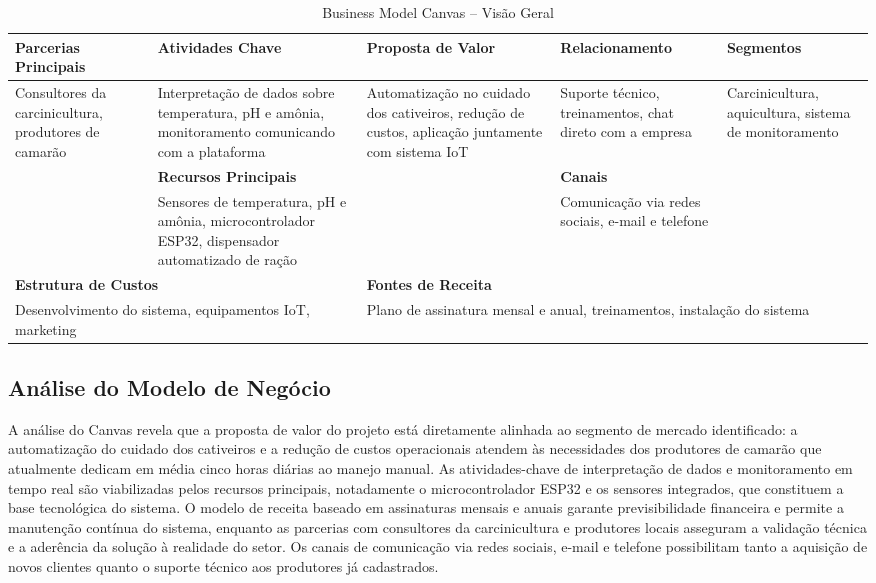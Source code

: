 \documentclass[11pt,a4paper]{article}
\begin{document}
\begin{table}[H]
\centering
\caption{Business Model Canvas -- Visão Geral}
\label{tab:canvas}
\small
\begin{tabular}{|p{2.5cm}|p{2.5cm}|p{2.8cm}|p{2.5cm}|p{2.8cm}|}
\hline
\textbf{Parcerias Principais} & \textbf{Atividades Chave} & \textbf{Proposta de Valor} & \textbf{Relacionamento} & \textbf{Segmentos} \\
\hline
Consultores da carcinicultura, produtores de camarão & Interpretação de dados sobre temperatura, pH e amônia, monitoramento comunicando com a plataforma & Automatização no cuidado dos cativeiros, redução de custos, aplicação juntamente com sistema IoT & Suporte técnico, treinamentos, chat direto com a empresa & Carcinicultura, aquicultura, sistema de monitoramento \\
\hline
 & \textbf{Recursos Principais} & & \textbf{Canais} & \\
\hline
 & Sensores de temperatura, pH e amônia, microcontrolador ESP32, dispensador automatizado de ração & & Comunicação via redes sociais, e-mail e telefone & \\
\hline
\multicolumn{2}{|p{5.5cm}|}{\textbf{Estrutura de Custos}} & \multicolumn{3}{p{7.5cm}|}{\textbf{Fontes de Receita}} \\
\hline
\multicolumn{2}{|p{5.5cm}|}{Desenvolvimento do sistema, equipamentos IoT, marketing} & \multicolumn{3}{p{7.5cm}|}{Plano de assinatura mensal e anual, treinamentos, instalação do sistema} \\
\hline
\end{tabular}
\end{table}

\subsection{Análise do Modelo de Negócio}

A análise do Canvas revela que a proposta de valor do projeto está diretamente alinhada ao segmento de mercado identificado: a automatização do cuidado dos cativeiros e a redução de custos operacionais atendem às necessidades dos produtores de camarão que atualmente dedicam em média cinco horas diárias ao manejo manual. As atividades-chave de interpretação de dados e monitoramento em tempo real são viabilizadas pelos recursos principais, notadamente o microcontrolador ESP32 e os sensores integrados, que constituem a base tecnológica do sistema. O modelo de receita baseado em assinaturas mensais e anuais garante previsibilidade financeira e permite a manutenção contínua do sistema, enquanto as parcerias com consultores da carcinicultura e produtores locais asseguram a validação técnica e a aderência da solução à realidade do setor. Os canais de comunicação via redes sociais, e-mail e telefone possibilitam tanto a aquisição de novos clientes quanto o suporte técnico aos produtores já cadastrados.
\end{document}
